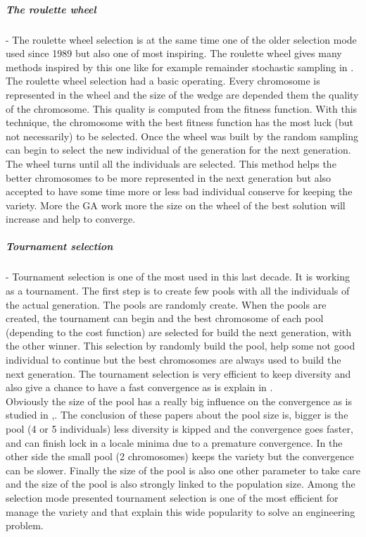 \subparagraph{The roulette wheel}
-	The roulette wheel selection is at the same time one of the older selection mode used since 1989 but also one of most inspiring.  The roulette wheel  gives many methods inspired by this one like for example remainder stochastic sampling in  \cite{138*whitley1994}. The roulette wheel selection had a basic operating. Every chromosome is represented in the wheel and the size of the wedge are depended them the quality of the chromosome. This quality is computed from the fitness function.  With this technique, the chromosome with the best fitness function has the most luck (but not necessarily) to be selected. 
Once the wheel was built by the random sampling can begin to select the new individual of the generation for the next generation.  The wheel turns until all the individuals are selected.  
This method helps the better chromosomes to be more represented in the next generation but also accepted to have some time more or less bad individual conserve for keeping the variety. More the GA work more the size on the wheel of the best solution will increase and help to converge. \\

\subparagraph{Tournament selection}
-	Tournament selection is one of the most used  in this last decade. It is working as a tournament. 
The first step is to create few pools with all the individuals of the actual generation. The pools are randomly create.
 When the pools are created, the tournament can begin and the best chromosome of each pool (depending to the cost function) are selected for build the next generation, with the other winner. 
 This selection by randomly build the pool, help some not good individual to continue but the best chromosomes are always used to build the next generation. The tournament selection is very efficient to keep diversity and also give a chance to have a fast convergence as is explain in \cite{64*matsui1999}. \\ 
 Obviously the size of the pool has a really big influence on the convergence as is studied in ,\cite{64*matsui1999,95*miller1995}. The conclusion of these papers about the pool size  is, bigger is  the pool (4 or 5 individuals) less diversity is kipped and the convergence goes faster, and can finish lock in a locale minima due to a premature convergence.
  In the other side the small pool (2 chromosomes) keeps the variety but the convergence can be slower. 
  Finally the size of the pool is also one other parameter to take care and the size of the pool is also strongly linked to the population size.
Among the selection mode presented tournament selection is one of the most efficient  for manage the  variety and that explain this  wide popularity to solve an engineering problem. \\ 

